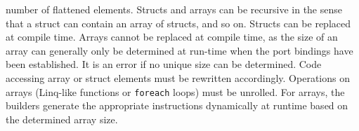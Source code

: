 \documentclass[a4paper,10pt,english]{article}
\begin{document}
\begin{itemize}
	number of flattened elements. Structs and arrays can be recursive in the sense that a struct can contain an array of structs,
	and so on. Structs can be replaced at compile time. Arrays cannot be replaced at compile time, as the size of an array can
	generally only be determined at run-time when the port bindings have been established. It is an error if no unique size can be
	determined. Code accessing array or struct elements must be rewritten accordingly. Operations on arrays (Linq-like functions or
	\texttt{foreach} loops) must be unrolled. For arrays, the builders generate the appropriate instructions dynamically at runtime
	based on the determined array size.
\end{itemize}
\end{document}
